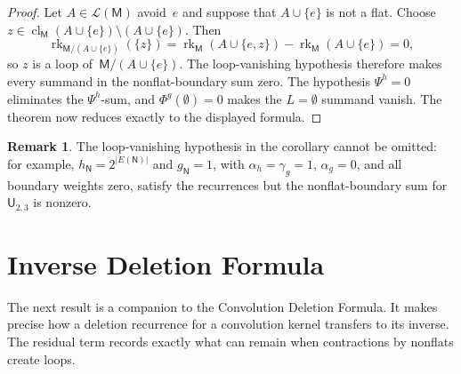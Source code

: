 \documentclass[12pt,letterpaper,english]{amsart}
\theoremstyle{teoremas}
\theoremstyle{definition}
\newtheorem{remark}[theorem]{Remark}
\DeclareMathOperator{\rk}{rk}
\DeclareMathOperator{\cl}{cl}
\newcommand{\M}{\mathsf{M}}
\newcommand{\N}{\mathsf{N}}
\newcommand{\U}{\mathsf{U}}
\begin{document}
\begin{proof}
Let $A \in \mathcal{L}(\M)$ avoid~$e$ and suppose that $A \cup \{e\}$
is not a flat.  Choose
$z \in \cl_{\M}(A \cup \{e\}) \setminus (A \cup \{e\})$.
Then
\[
\rk_{\M/(A \cup \{e\})}(\{z\})
= \rk_{\M}(A \cup \{e,z\}) - \rk_{\M}(A \cup \{e\}) = 0,
\]
so $z$ is a loop of~$\M/(A \cup \{e\})$.
The loop-vanishing hypothesis therefore makes every summand in the
nonflat-boundary sum zero.  The hypothesis $\Psi^h = 0$ eliminates the
$\Psi^h$-sum, and $\Phi^g(\emptyset) = 0$ makes the $L = \emptyset$
summand vanish.  The theorem now reduces exactly to the displayed formula.
\end{proof}

\begin{remark}\label{rem:loop-vanish-needed}
The loop-vanishing hypothesis in the corollary cannot be omitted:
for example, $h_{\N} = 2^{|E(\N)|}$ and $g_{\N} = 1$, with
$\alpha_h = \gamma_g = 1$, $\alpha_g = 0$, and all boundary weights zero,
satisfy the recurrences but the nonflat-boundary sum for~$\U_{2,3}$ is nonzero.
\end{remark}


\section{Inverse Deletion Formula}

The next result is a companion to the Convolution Deletion Formula.
It makes precise how a deletion recurrence for a convolution kernel
transfers to its inverse.  The residual term records exactly what can
remain when contractions by nonflats create loops.
\end{document}
